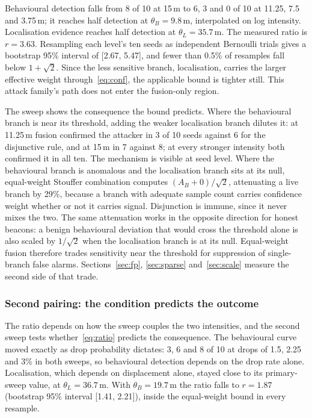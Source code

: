 \documentclass[pdflatex,sn-mathphys-num]{sn-jnl}%
\theoremstyle{thmstyleone}%
\theoremstyle{thmstyletwo}%
\theoremstyle{thmstylethree}%
\begin{document}
Behavioural detection falls from 8 of 10 at 15\,m to 6, 3 and 0 of 10 at 11.25,
7.5 and 3.75\,m; it reaches half detection at $\theta_B = 9.8$\,m, interpolated
on log intensity. Localisation evidence reaches half detection at
$\theta_L = 35.7$\,m. The measured ratio is $r = 3.63$. Resampling each level's
ten seeds as independent Bernoulli trials gives a bootstrap 95\% interval of
[2.67, 5.47], and fewer than 0.5\% of resamples fall below $1+\sqrt2$. Since
the less sensitive branch, localisation, carries the larger effective weight
through~\eqref{eq:conf}, the applicable bound is tighter still. This attack
family's path does not enter the fusion-only region.

The sweep shows the consequence the bound predicts. Where the behavioural
branch is near its threshold, adding the weaker localisation branch dilutes
it: at 11.25\,m fusion confirmed the attacker in 3 of 10 seeds against 6 for
the disjunctive rule, and at 15\,m in 7 against 8; at every stronger intensity
both confirmed it in all ten. The mechanism is visible at seed level. Where the
behavioural branch is anomalous and the localisation branch sits at its null,
equal-weight Stouffer combination computes $(A_B + 0)/\sqrt2$, attenuating a
live branch by 29\%, because a branch with adequate sample count carries
confidence weight whether or not it carries signal. Disjunction is immune,
since it never mixes the two. The same attenuation works in the opposite
direction for honest beacons: a benign behavioural deviation that would cross
the threshold alone is also scaled by $1/\sqrt2$ when the localisation branch
is at its null. Equal-weight fusion therefore trades sensitivity near the
threshold for suppression of single-branch false alarms. Sections~\ref{sec:fp},
\ref{sec:sparse} and~\ref{sec:scale} measure the second side of that trade.

\subsubsection{Second pairing: the condition predicts the outcome}

The ratio depends on how the sweep couples the two intensities, and the second
sweep tests whether~\eqref{eq:ratio} predicts the consequence. The behavioural
curve moved exactly as drop probability dictates: 3, 6 and 8 of 10 at drops of
1.5, 2.25 and 3\% in both sweeps, so behavioural detection depends on the drop
rate alone. Localisation, which depends on displacement alone, stayed close
to its primary-sweep value, at $\theta_L = 36.7$\,m. With $\theta_B = 19.7$\,m the ratio falls to $r = 1.87$
(bootstrap 95\% interval [1.41, 2.21]), inside the equal-weight bound in every
resample.
\end{document}
